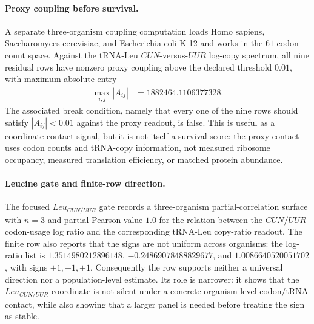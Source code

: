 \paragraph{Proxy coupling before survival.}
A separate three-organism coupling computation loads Homo sapiens, Saccharomyces cerevisiae, and Escherichia coli K-12 and works in the $61$-codon count space.  Against the tRNA-Leu $CUN$-versus-$UUR$ log-copy spectrum, all nine residual rows have nonzero proxy coupling above the declared threshold $0.01$, with maximum absolute entry
$$
\begin{aligned}
\max_{i,j}|A_{ij}| &= 1882464.1106377328.
\end{aligned}
$$
The associated break condition, namely that every one of the nine rows should satisfy $|A_{ij}|<0.01$ against the proxy readout, is false.  This is useful as a coordinate-contact signal, but it is not itself a survival score: the proxy contact uses codon counts and tRNA-copy information, not measured ribosome occupancy, measured translation efficiency, or matched protein abundance.

\paragraph{Leucine gate and finite-row direction.}
The focused $Leu_{CUN/UUR}$ gate records a three-organism partial-correlation surface with $n=3$ and partial Pearson value $1.0$ for the relation between the $CUN/UUR$ codon-usage log ratio and the corresponding tRNA-Leu copy-ratio readout.  The finite row also reports that the signs are not uniform across organisms: the log-ratio list is $1.3514980212896148$, $-0.24869078488829677$, and $1.0086640520051702$, with signs $+1,-1,+1$.  Consequently the row supports neither a universal direction nor a population-level estimate.  Its role is narrower: it shows that the $Leu_{CUN/UUR}$ coordinate is not silent under a concrete organism-level codon/tRNA contact, while also showing that a larger panel is needed before treating the sign as stable.

